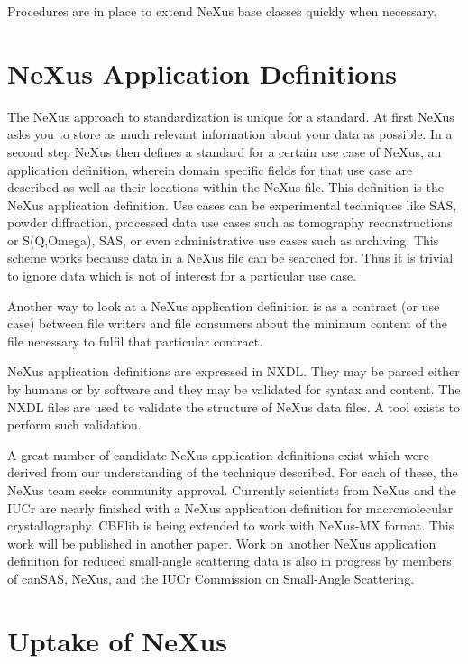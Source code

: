 \documentclass[%
 aip,
rsi,
 amsmath,amssymb,
 reprint,%
]{revtex4-1}
\begin{document}
Procedures are in place to extend NeXus base classes quickly when necessary.


\section{NeXus Application Definitions}

The NeXus approach to standardization is unique for a standard. At first NeXus asks you to store 
as much relevant information about your data as possible. In a second step NeXus then defines a 
standard for a certain use case of NeXus, an application definition, wherein domain specific fields 
for that use case are described as well as their locations within the NeXus file. This 
definition is the NeXus application definition. Use cases can be experimental techniques like SAS, 
powder diffraction, processed data use cases such as tomography reconstructions or S(Q,Omega), SAS,
or even administrative use cases such as archiving. This scheme works because data in a NeXus file 
can be searched for. Thus it is trivial to ignore data which is not of interest for a particular use case.

Another way to look at a NeXus application definition is as a contract (or use case) between file writers and file consumers 
about the minimum content of the file necessary to fulfil that  particular contract.

NeXus application definitions are expressed in NXDL.  They may be parsed either by humans or by software and 
they may be validated for syntax and content.  The NXDL files are used to validate the structure of
NeXus data files. A tool exists to perform such validation.

A great number of candidate NeXus application definitions exist which were derived from our understanding 
of the technique described. For each of these, the NeXus team seeks community approval. 
Currently scientists 
from NeXus and the IUCr are nearly finished with a NeXus application definition for macromolecular crystallography.
CBFlib\cite{cbflib} is being extended to work with NeXus-MX format. This work will be published in another paper. 
Work on another NeXus application definition for reduced small-angle scattering data
is also in progress\cite{cansas}  by members of 
canSAS, NeXus, and the IUCr Commission on Small-Angle Scattering.


\section{Uptake of NeXus} 
\end{document}
